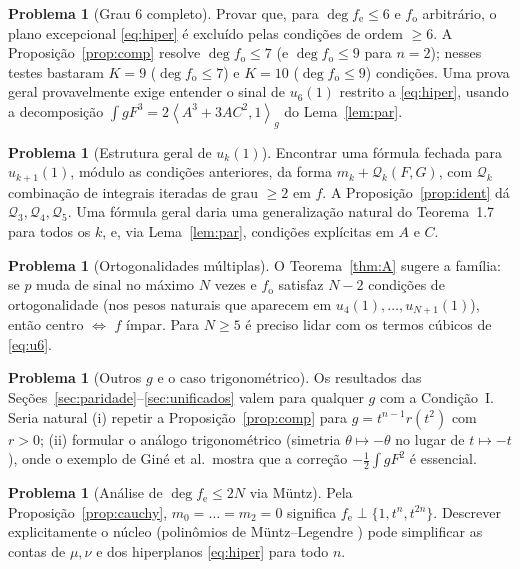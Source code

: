 \documentclass[11pt]{article}
\theoremstyle{plain}
\theoremstyle{definition}
\newtheorem{problem}[theorem]{Problema}
\theoremstyle{remark}
\newcommand{\fe}{f_{\mathrm e}}
\newcommand{\fo}{f_{\mathrm o}}
\newcommand{\ip}[2]{\left\langle #1,#2\right\rangle}
\begin{document}
\begin{problem}[Grau $6$ completo]
Provar que, para $\deg\fe\le6$ e $\fo$ arbitrário, o plano excepcional
\eqref{eq:hiper} é excluído pelas condições de ordem $\ge6$. A
Proposição~\ref{prop:comp} resolve $\deg\fo\le7$ (e $\deg\fo\le9$ para $n=2$);
nesses testes bastaram $K=9$ ($\deg\fo\le7$) e $K=10$ ($\deg\fo\le9$) condições. Uma prova geral provavelmente exige entender o sinal de
$u_6(1)$ restrito a \eqref{eq:hiper}, usando a decomposição
$\int gF^3=2\ip{A^3+3AC^2}{1}_g$ do Lema~\ref{lem:par}.
\end{problem}

\begin{problem}[Estrutura geral de $u_k(1)$]
Encontrar uma fórmula fechada para $u_{k+1}(1)$, módulo as condições anteriores,
da forma $m_k+\mathcal Q_k(F,G)$, com $\mathcal Q_k$ combinação de integrais
iteradas de grau $\ge2$ em $f$. A Proposição~\ref{prop:ident} dá
$\mathcal Q_3,\mathcal Q_4,\mathcal Q_5$. Uma fórmula geral daria uma
generalização natural do Teorema~1.7 para todos os $k$, e, via
Lema~\ref{lem:par}, condições explícitas em $A$ e $C$.
\end{problem}

\begin{problem}[Ortogonalidades múltiplas]
O Teorema~\ref{thm:A} sugere a família: se $p$ muda de sinal no máximo $N$ vezes
e $\fo$ satisfaz $N-2$ condições de ortogonalidade (nos pesos naturais que
aparecem em $u_4(1),\dots,u_{N+1}(1)$), então centro $\Leftrightarrow$ $f$ ímpar.
Para $N\ge5$ é preciso lidar com os termos cúbicos de \eqref{eq:u6}.
\end{problem}

\begin{problem}[Outros $g$ e o caso trigonométrico]
Os resultados das Seções~\ref{sec:paridade}--\ref{sec:unificados} valem para
qualquer $g$ com a Condição~I. Seria natural (i) repetir a
Proposição~\ref{prop:comp} para $g=t^{n-1}r(t^2)$ com $r>0$; (ii) formular o
análogo trigonométrico (simetria $\theta\mapsto-\theta$ no lugar de $t\mapsto-t$),
onde o exemplo de Giné et al.\ mostra que a correção $-\frac12\int gF^2$ é
essencial.
\end{problem}

\begin{problem}[Análise de $\deg\fe\le 2N$ via Müntz]
Pela Proposição~\ref{prop:cauchy}, $m_0=\dots=m_2=0$ significa
$\fe\perp\{1,t^n,t^{2n}\}$. Descrever explicitamente o núcleo (polinômios de
Müntz--Legendre \cite{BE95}) pode simplificar as contas de $\mu,\nu$ e dos
hiperplanos \eqref{eq:hiper} para todo $n$.
\end{problem}
\end{document}
